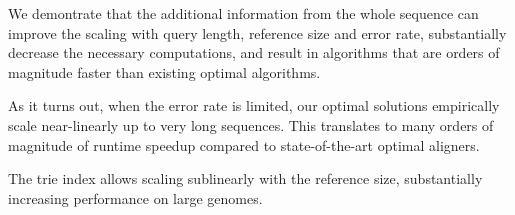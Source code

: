 We demontrate that the additional information from the whole sequence can
improve the scaling with query length, reference size and error rate,
substantially decrease the necessary computations, and result in algorithms that
are orders of magnitude faster than existing optimal algorithms.

As it turns out, when the error rate is limited, our optimal solutions
empirically scale near-linearly up to very long sequences. This translates to
many orders of magnitude of runtime speedup compared to state-of-the-art optimal
aligners.

The trie index allows scaling sublinearly with the
reference size, substantially increasing performance on large genomes.

